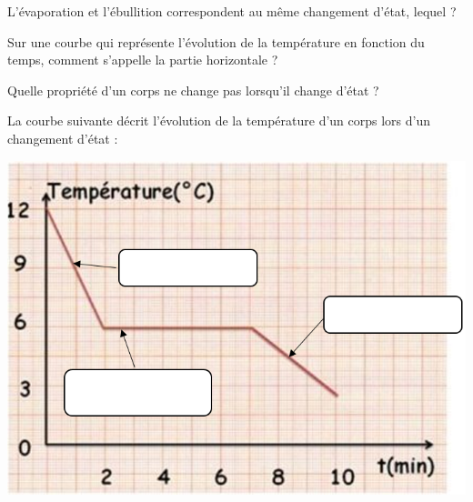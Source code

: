 
\begin{questions}
	\question[2] L'évaporation et l'ébullition correspondent au même changement d'état, lequel ?
	
	\fillwithdottedlines{1.5cm}  
	
	\question[2] Sur une courbe qui représente l'évolution de la température en fonction du temps, comment s'appelle la partie horizontale ?
	
	\fillwithdottedlines{1.5cm}  
	
	
	\question[2] Quelle propriété d'un corps ne change pas lorsqu'il change d'état ?
	
	\fillwithdottedlines{1.5cm}  
	
	\question[6] La courbe suivante décrit l'évolution de la température d'un corps lors d'un changement d'état :
	
	\begin{center}
		\includegraphics[scale=0.7]{courbe2}
	\end{center}
	
	

\end{questions}
